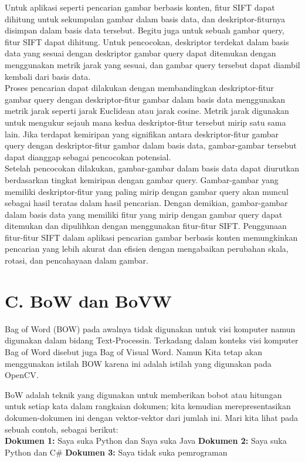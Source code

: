 \documentclass[
  letterpaper,
  DIV=11,
  numbers=noendperiod]{scrreprt}
\begin{document}
Untuk aplikasi seperti pencarian gambar berbasis konten, fitur SIFT
dapat dihitung untuk sekumpulan gambar dalam basis data, dan
deskriptor-fiturnya disimpan dalam basis data tersebut. Begitu juga
untuk sebuah gambar query, fitur SIFT dapat dihitung. Untuk pencocokan,
deskriptor terdekat dalam basis data yang sesuai dengan deskriptor
gambar query dapat ditemukan dengan menggunakan metrik jarak yang
sesuai, dan gambar query tersebut dapat diambil kembali dari basis
data.\\
Proses pencarian dapat dilakukan dengan membandingkan deskriptor-fitur
gambar query dengan deskriptor-fitur gambar dalam basis data menggunakan
metrik jarak seperti jarak Euclidean atau jarak cosine. Metrik jarak
digunakan untuk mengukur sejauh mana kedua deskriptor-fitur tersebut
mirip satu sama lain. Jika terdapat kemiripan yang signifikan antara
deskriptor-fitur gambar query dengan deskriptor-fitur gambar dalam basis
data, gambar-gambar tersebut dapat dianggap sebagai pencocokan
potensial.\\
Setelah pencocokan dilakukan, gambar-gambar dalam basis data dapat
diurutkan berdasarkan tingkat kemiripan dengan gambar query.
Gambar-gambar yang memiliki deskriptor-fitur yang paling mirip dengan
gambar query akan muncul sebagai hasil teratas dalam hasil pencarian.
Dengan demikian, gambar-gambar dalam basis data yang memiliki fitur yang
mirip dengan gambar query dapat ditemukan dan dipulihkan dengan
menggunakan fitur-fitur SIFT. Penggunaan fitur-fitur SIFT dalam aplikasi
pencarian gambar berbasis konten memungkinkan pencarian yang lebih
akurat dan efisien dengan mengabaikan perubahan skala, rotasi, dan
pencahayaan dalam gambar.

\hypertarget{c.-bow-dan-bovw}{%
\section*{C. BoW dan BoVW}\label{c.-bow-dan-bovw}}


Bag of Word (BOW) pada awalnya tidak digunakan untuk visi komputer namun
digunakan dalam bidang Text-Processin. Terkadang dalam konteks visi
komputer Bag of Word disebut juga Bag of Visual Word. Namun Kita tetap
akan menggunakan istilah BOW karena ini adalah istilah yang digunakan
pada OpenCV.

BoW adalah teknik yang digunakan untuk memberikan bobot atau hitungan
untuk setiap kata dalam rangkaian dokumen; kita kemudian
merepresentasikan dokumen-dokumen ini dengan vektor-vektor dari jumlah
ini. Mari kita lihat pada sebuah contoh, sebagai berikut:\\
\textbf{Dokumen 1:} Saya suka Python dan Saya suka Java \textbf{Dokumen
2:} Saya suka Python dan C\# \textbf{Dokumen 3:} Saya tidak suka
pemrograman
\end{document}
